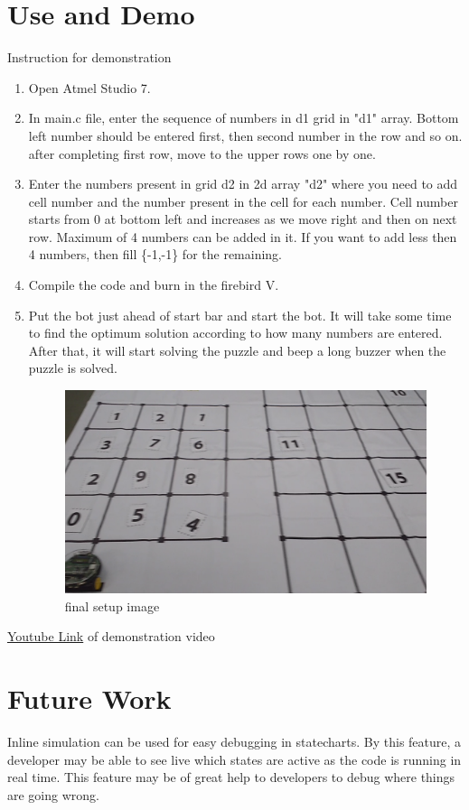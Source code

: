 \documentclass[a4paper,12pt,oneside]{book}
\begin{document}
\section{Use and Demo}
Instruction for demonstration

\begin{enumerate}
	\item Open Atmel Studio 7.
	\item In main.c file, enter the sequence of numbers in d1 grid in "d1" array. Bottom left number should be entered first, then second number in the row and so on. after completing first row, move to the upper rows one by one.
	\item Enter the numbers present in grid d2 in 2d array "d2" where you need to add cell number and the number present in the cell for each number. Cell number starts from 0 at bottom left and increases as we move right and then on next row. Maximum of 4 numbers can be added in it. If you want to add less then 4 numbers, then fill \{-1,-1\} for the remaining.
	\item Compile the code and burn in the firebird V.
	\item Put the bot just ahead of start bar and start the bot. It will take some time to find the optimum solution according to how many numbers are entered. After that, it will start solving the puzzle and beep a long buzzer when the puzzle is solved.
	\begin{figure}[h]
		\includegraphics[scale=.3]{final_setup.png}
		\caption{final setup image}
	\end{figure}
	 
\end{enumerate}
\href{https://www.youtube.com/watch?v=SvR-iOOgiqY}{Youtube Link} of demonstration video 

\section{Future Work}
Inline simulation can be used for easy debugging in statecharts. By this feature, a developer may be able to see live which states are active as the code is running in real time. This feature may be of great help to developers to debug where things are going wrong.
\end{document}
